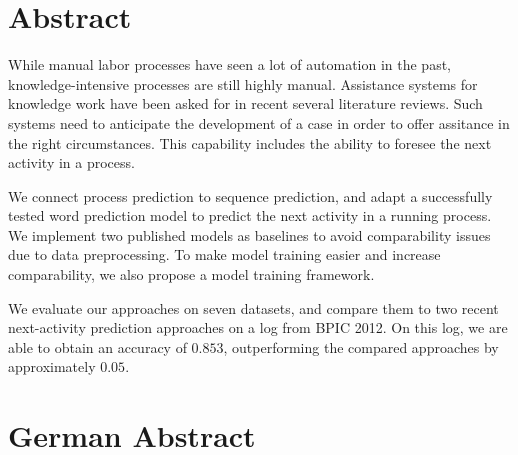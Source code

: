 


\begingroup
\let\clearpage\relax
\let\cleardoublepage\relax
\let\cleardoublepage\relax

\chapter*{Abstract}
While manual labor processes have seen a lot of automation in the past,
knowledge-intensive processes are still highly manual.
Assistance systems for knowledge work have been asked for in recent several literature reviews.
Such systems need to anticipate the development of a case in order to offer assitance in the right circumstances.
This capability includes the ability to foresee the next activity in a process.

We connect process prediction to sequence prediction, and adapt a successfully tested word prediction model to predict the next activity in a running process.
We implement two published models as baselines to avoid comparability issues due to data preprocessing.
To make model training easier and increase comparability, we also propose a model training framework.

We evaluate our approaches on seven datasets, and compare them to two recent next-activity prediction approaches on a log from BPIC 2012. On this log, we are able to obtain an accuracy of $0.853$, outperforming the compared approaches by approximately $0.05$.

\vfill

\chapter*{German Abstract}

\endgroup

\vfill

